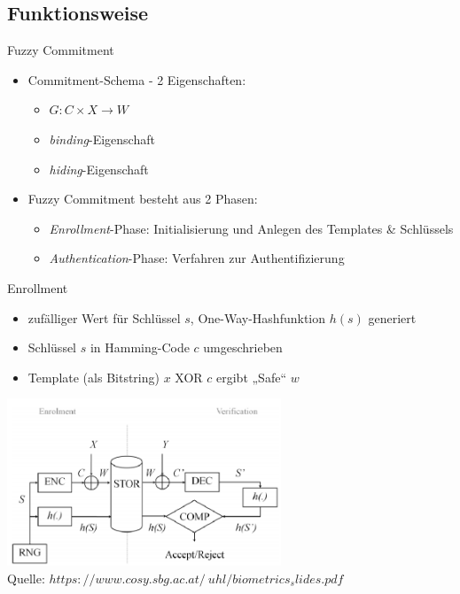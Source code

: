 \documentclass{beamer}
\begin{document}
\subsection{Funktionsweise}
\begin{frame}{Fuzzy Commitment}
	\begin{itemize}
		\item Commitment-Schema - 2 Eigenschaften:
		\begin{itemize}
			\item $G : C\times X \rightarrow W$
			\item \textit{binding}-Eigenschaft
			\item \textit{hiding}-Eigenschaft
		\end{itemize}
		\item Fuzzy Commitment besteht aus 2 Phasen:
		\begin{itemize}
			\item \textit{Enrollment}-Phase: Initialisierung und Anlegen des Templates \& Schl\"ussels
			\item \textit{Authentication}-Phase: Verfahren zur Authentifizierung 
		\end{itemize}
	\end{itemize}
\end{frame}
\begin{frame}{Enrollment}
	\begin{itemize}
		\item zuf\"alliger Wert f\"ur Schl\"ussel $s$, One-Way-Hashfunktion $h(s)$ generiert
		\item Schl\"ussel $s$ in Hamming-Code $c$ umgeschrieben
		\item Template (als Bitstring) $x$ XOR $c$ ergibt „Safe“ $w$
	\end{itemize}
	\hspace{10mm}\includegraphics[height=5cm]{fcs.png}\\
	\tiny{Quelle: \textit{\tiny{$https://www.cosy.sbg.ac.at/~uhl/biometrics_slides.pdf$}}}
\end{frame}
\end{document}
